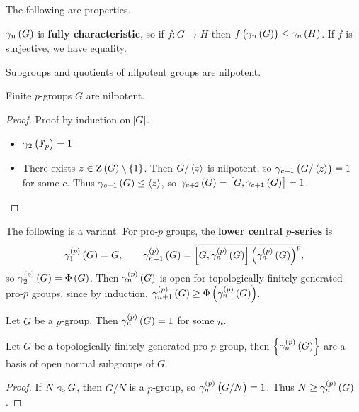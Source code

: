 The following are properties.

\begin{proposition}
$ \gamma_n\br{G} $ is \textbf{fully characteristic}, so if $ f : G \to H $ then $ f\br{\gamma_n\br{G}} \le \gamma_n\br{H} $. If $ f $ is surjective, we have equality.
\end{proposition}

\begin{proposition}
Subgroups and quotients of nilpotent groups are nilpotent.
\end{proposition}

\begin{proposition}
Finite $ p $-groups $ G $ are nilpotent.
\end{proposition}

\begin{proof}
Proof by induction on $ \abs{G} $.
\begin{itemize}
\item $ \gamma_2\br{\FF_p} = 1 $.
\item There exists $ z \in \Z\br{G} \setminus \cbr{1} $. Then $ G / \left\langle z \right\rangle $ is nilpotent, so $ \gamma_{c + 1}\br{G / \abr{z}} = 1 $ for some $ c $. Thus $ \gamma_{c + 1}\br{G} \le \abr{z} $, so $ \gamma_{c + 2}\br{G} = \sbr{G, \gamma_{c + 1}\br{G}} = 1 $.
\end{itemize}
\end{proof}

The following is a variant. For pro-$ p $ groups, the \textbf{lower central $ p $-series} is
$$ \gamma_1^{\br{p}}\br{G} = G, \qquad \gamma_{n + 1}^{\br{p}}\br{G} = \overline{\sbr{G, \gamma_n^{\br{p}}\br{G}}\br{\gamma_n^{\br{p}}\br{G}}^p}, $$
so $ \gamma_2^{\br{p}}\br{G} = \Phi\br{G} $. Then $ \gamma_n^{\br{p}}\br{G} $ is open for topologically finitely generated pro-$ p $ groups, since by induction, $ \gamma_{n + 1}^{\br{p}}\br{G} \ge \Phi\br{\gamma_n^{\br{p}}\br{G}} $.

\begin{proposition}
Let $ G $ be a $ p $-group. Then $ \gamma_n^{\br{p}}\br{G} = 1 $ for some $ n $.
\end{proposition}

\begin{proposition}
Let $ G $ be a topologically finitely generated pro-$ p $ group, then $ \cbr{\gamma_n^{\br{p}}\br{G}} $ are a basis of open normal subgroups of $ G $.
\end{proposition}

\begin{proof}
If $ N \triangleleft_{\mathrm{o}} G $, then $ G / N $ is a $ p $-group, so $ \gamma_n^{\br{p}}\br{G / N} = 1 $. Thus $ N \ge \gamma_n^{\br{p}}\br{G} $.
\end{proof}

